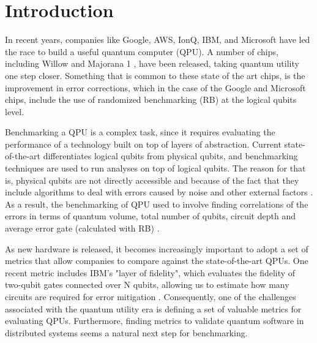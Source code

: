 \section*{Introduction}


In recent years, companies like Google, AWS, IonQ, IBM, and Microsoft have led the race to build a useful quantum computer (QPU). A number of chips, including Willow \cite{acharyaQuantumErrorCorrection2025_2025} and Majorana 1 \cite{aasenRoadmapFaultTolerant2025_2025}, have been released, taking quantum utility one step closer. Something that is common to these state of the art chips, is the improvement in error corrections, which in the case of the Google and Microsoft chips, include the use of randomized benchmarking (RB) at the logical qubits level.



Benchmarking a QPU is a complex task, since it requires evaluating the performance of a technology built on top of layers of abstraction. Current state-of-the-art differentiates logical qubits from physical qubits, and benchmarking techniques are used to run analyses on top of logical qubits. The reason for that is, physical qubits are not directly accessible and because of the fact that they include algorithms to deal with errors caused by noise and other external factors \cite{campbellRoadsFaulttolerantUniversal2017_2017, tomitaLowdistanceSurfaceCodes_2014}. As a result, the benchmarking of QPU used to involve finding correlations of the errors in terms of quantum volume, total number of qubits, circuit depth and average error gate (calculated with RB) \cite{proctorBenchmarkingQuantumComputers2025_2025}.


As new hardware is released, it becomes increasingly important to adopt a set of metrics that allow companies to compare against the state-of-the-art QPUs. One recent metric includes IBM's "layer of fidelity", which evaluates the fidelity of two-qubit gates connected over N qubits, allowing us to estimate how many circuits are required for error mitigation \cite{mckayBenchmarkingQuantumProcessor2023_2023}. Consequently, one of the challenges associated with the quantum utility era is defining a set of valuable metrics for evaluating QPUs. Furthermore, finding metrics to validate quantum software in distributed systems seems a natural next step for benchmarking.

